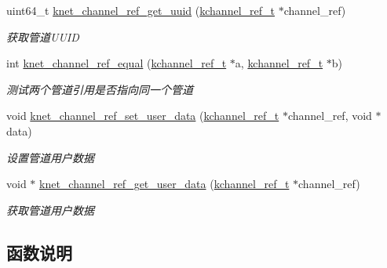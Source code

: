 \begin{DoxyCompactItemize}
uint64\+\_\+t \hyperlink{a00129_ga33f0ef5b9b57ff12a51579e222807335_ga33f0ef5b9b57ff12a51579e222807335}{knet\+\_\+channel\+\_\+ref\+\_\+get\+\_\+uuid} (\hyperlink{a00066_a3b7e82599367eade261456f60ebe2cd9_a3b7e82599367eade261456f60ebe2cd9}{kchannel\+\_\+ref\+\_\+t} $\ast$channel\+\_\+ref)
\begin{DoxyCompactList}\small\item\em 获取管道\+U\+U\+I\+D \end{DoxyCompactList}\item 
int \hyperlink{a00129_ga021034214898a7509914a336a1afb47a_ga021034214898a7509914a336a1afb47a}{knet\+\_\+channel\+\_\+ref\+\_\+equal} (\hyperlink{a00066_a3b7e82599367eade261456f60ebe2cd9_a3b7e82599367eade261456f60ebe2cd9}{kchannel\+\_\+ref\+\_\+t} $\ast$a, \hyperlink{a00066_a3b7e82599367eade261456f60ebe2cd9_a3b7e82599367eade261456f60ebe2cd9}{kchannel\+\_\+ref\+\_\+t} $\ast$b)
\begin{DoxyCompactList}\small\item\em 测试两个管道引用是否指向同一个管道 \end{DoxyCompactList}\item 
void \hyperlink{a00129_ga21f85fcd9fe24484f3dbe368eac5e9bb_ga21f85fcd9fe24484f3dbe368eac5e9bb}{knet\+\_\+channel\+\_\+ref\+\_\+set\+\_\+user\+\_\+data} (\hyperlink{a00066_a3b7e82599367eade261456f60ebe2cd9_a3b7e82599367eade261456f60ebe2cd9}{kchannel\+\_\+ref\+\_\+t} $\ast$channel\+\_\+ref, void $\ast$data)
\begin{DoxyCompactList}\small\item\em 设置管道用户数据 \end{DoxyCompactList}\item 
void $\ast$ \hyperlink{a00129_gabd02f58cb58b94071796e06bad804369_gabd02f58cb58b94071796e06bad804369}{knet\+\_\+channel\+\_\+ref\+\_\+get\+\_\+user\+\_\+data} (\hyperlink{a00066_a3b7e82599367eade261456f60ebe2cd9_a3b7e82599367eade261456f60ebe2cd9}{kchannel\+\_\+ref\+\_\+t} $\ast$channel\+\_\+ref)
\begin{DoxyCompactList}\small\item\em 获取管道用户数据 \end{DoxyCompactList}\end{DoxyCompactItemize}


\subsection{函数说明}
\hypertarget{a00129_ga92a683023f347ae7c4eb692180884a01_ga92a683023f347ae7c4eb692180884a01}{}
